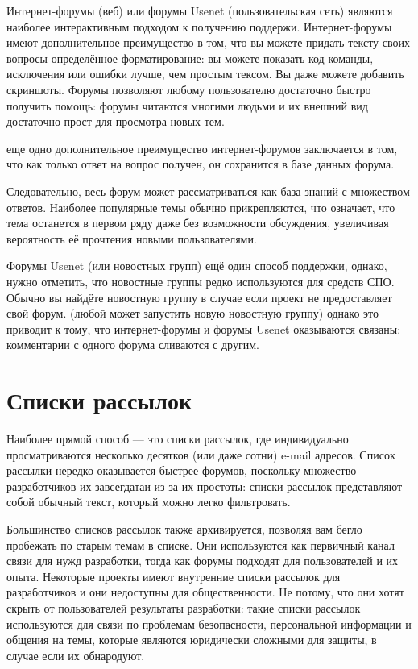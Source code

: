 \documentclass[10pt]{book}
\begin{document}
Интернет-форумы (веб) или форумы Usenet (пользовательская сеть) являются наиболее интерактивным подходом к получению поддержи. Интернет-форумы имеют дополнительное преимущество в том, что вы можете придать тексту своих вопросы определённое форматирование: вы можете показать код команды, исключения или ошибки лучше, чем простым тексом. Вы даже можете добавить скриншоты. Форумы позволяют любому пользователю достаточно быстро получить помощь: форумы читаются многими людьми и их внешний вид достаточно прост для просмотра новых тем. 

еще одно дополнительное преимущество интернет-форумов заключается в том, что как только ответ на вопрос получен, он сохранится в базе данных форума.

Следовательно, весь форум может рассматриваться как база знаний с множеством ответов. Наиболее популярные темы обычно прикрепляются, что означает, что тема останется в первом ряду даже без возможности обсуждения, увеличивая вероятность её прочтения новыми пользователями.

Форумы Usenet (или новостных групп) ещё один способ поддержки, однако, нужно отметить, что новостные группы редко используются для средств СПО. Обычно вы найдёте новостную группу в случае если проект не предоставляет свой форум. (любой может запустить новую новостную группу) однако это приводит к тому, что интернет-форумы и форумы Usenet оказываются связаны: комментарии с одного форума сливаются с другим.

\section{Списки рассылок}

Наиболее прямой способ — это списки рассылок, где индивидуально просматриваются несколько десятков (или даже сотни) e-mail адресов. Список рассылки нередко оказывается быстрее форумов, поскольку множество разработчиков их завсегдатаи из-за их простоты: списки рассылок представляют собой обычный текст, который можно легко фильтровать.

Большинство списков рассылок также архивируется, позволяя вам бегло пробежать по старым темам в списке. Они используются как первичный канал связи для нужд разработки, тогда как форумы подходят для пользователей и их опыта. Некоторые проекты имеют внутренние списки рассылок для разработчиков и они недоступны для общественности. Не потому, что они хотят скрыть от пользователей результаты разработки: такие списки рассылок используются для связи по проблемам безопасности, персональной информации и общения на темы, которые являются юридически сложными для защиты, в случае если их обнародуют.
\end{document}
